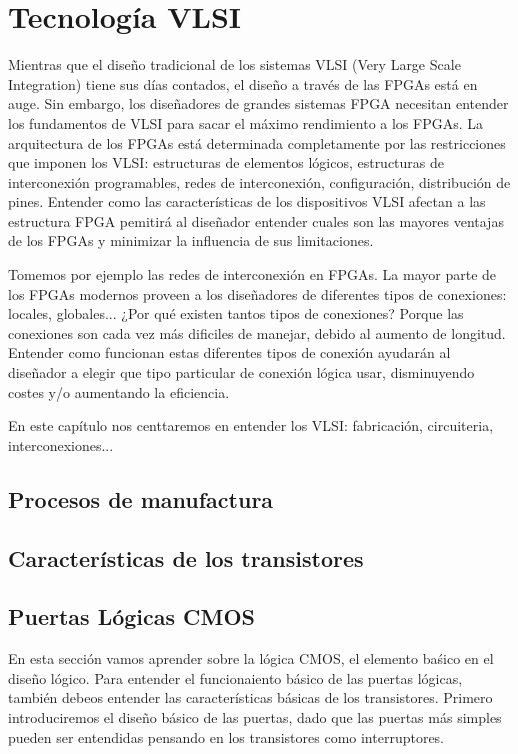 \chapter{Tecnología VLSI}

Mientras que el diseño tradicional de los sistemas VLSI (Very Large Scale Integration) tiene sus días contados, el diseño a través de las FPGAs está en auge. Sin embargo, los diseñadores de grandes sistemas FPGA necesitan entender los fundamentos de VLSI para sacar el máximo rendimiento a los FPGAs. La arquitectura de los FPGAs está determinada completamente por las restricciones que imponen los VLSI: estructuras de elementos lógicos, estructuras de interconexión programables, redes de interconexión, configuración, distribución de pines. Entender como las características de los dispositivos VLSI afectan a las estructura FPGA pemitirá al diseñador entender cuales son las mayores ventajas de los FPGAs y minimizar la influencia de sus limitaciones. 

Tomemos por ejemplo las redes de interconexión en FPGAs. La mayor parte de los FPGAs modernos proveen a los diseñadores de diferentes tipos de conexiones: locales, globales... ¿Por qué existen tantos tipos de conexiones? Porque las conexiones son cada vez más dificiles de manejar, debido al aumento de longitud. Entender como funcionan estas diferentes tipos de conexión ayudarán al diseñador a elegir que tipo particular de conexión lógica usar, disminuyendo costes y/o aumentando la eficiencia. 

En este capítulo nos centtaremos en entender los VLSI: fabricación, circuiteria, interconexiones... 

\section{Procesos de manufactura}

\section{Características de los transistores}

\section{Puertas Lógicas CMOS}

En esta sección vamos aprender sobre la lógica CMOS, el elemento baśico en el diseño lógico. Para entender el funcionaiento básico de las puertas lógicas, también debeos entender las características básicas de los transistores. Primero introduciremos el diseño básico de las puertas, dado que las puertas más simples pueden ser entendidas pensando en los transistores como interruptores. 

